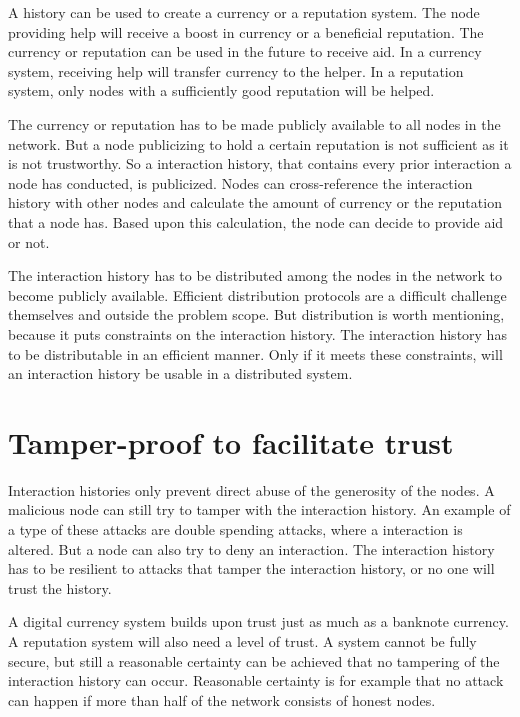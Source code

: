 A history can be used to create a currency or a reputation system.
The node providing help will receive a boost in currency or a beneficial reputation.
The currency or reputation can be used in the future to receive aid.
In a currency system, receiving help will transfer currency to the helper.
In a reputation system, only nodes with a sufficiently good reputation will be helped.

The currency or reputation has to be made publicly available to all nodes in the network.
But a node publicizing to hold a certain reputation is not sufficient as it is not trustworthy.
So a interaction history, that contains every prior interaction a node has conducted, is publicized.
Nodes can cross-reference the interaction history with other nodes and calculate the amount of currency 
or the reputation that a node has.
Based upon this calculation, the node can decide to provide aid or not.

The interaction history has to be distributed among the nodes in the network
to become publicly available.
Efficient distribution protocols are a difficult challenge themselves and outside the problem scope.
But distribution is worth mentioning, because it puts constraints on the interaction history.
The interaction history has to be distributable in an efficient manner.
Only if it meets these constraints, will an interaction history be usable in a distributed system.

\section{Tamper-proof to facilitate trust}

Interaction histories only prevent direct abuse of the generosity of the nodes.
A malicious node can still try to tamper with the interaction history.
An example of a type of these attacks are double spending attacks\cite{Nakamoto-bitcoin},
where a interaction is altered.
But a node can also try to deny an interaction.
The interaction history has to be resilient to attacks that tamper the interaction history, 
or no one will trust the history.

A digital currency system builds upon trust just as much as a banknote currency.
A reputation system will also need a level of trust.
A system cannot be fully secure, 
but still a reasonable certainty can be achieved that no tampering of the interaction history can occur.
Reasonable certainty is for example that no attack can happen 
if more than half of the network consists of honest nodes.

